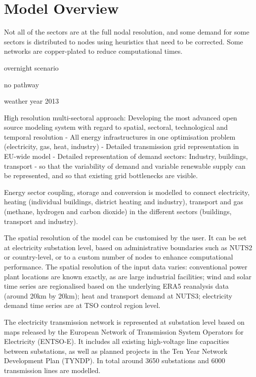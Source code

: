 \section{Model Overview}

Not all of the sectors are at the full nodal resolution, and some demand for
some sectors is distributed to nodes using heuristics that need to be corrected.
Some networks are copper-plated to reduce computational times.

overnight scenario

no pathway

weather year 2013

High resolution multi-sectoral approach: Developing the most advanced open source modeling system with regard to spatial, sectoral, technological and temporal resolution
- All energy infrastructures in one optimisation problem (electricity, gas, heat, industry)
- Detailed transmission grid representation in EU-wide model
- Detailed representation of demand sectors: Industry, buildings, transport
- so that the variability of demand and variable renewable supply can be represented, and so that existing grid bottlenecks are visible.

Energy sector coupling, storage and conversion is modelled to connect
electricity, heating (individual buildings, district heating and industry),
transport and gas (methane, hydrogen and carbon dioxide) in the different
sectors (buildings, transport and industry).

The spatial resolution of the model can be customised by the user. It can be set
at electricity substation level, based on administrative boundaries such as
NUTS2 or country-level, or to a custom number of nodes to enhance computational
performance. The spatial resolution of the input data varies: conventional power
plant locations are known exactly, as are large industrial facilities; wind and
solar time series are regionalised based on the underlying ERA5 reanalysis data
(around 20km by 20km); heat and transport demand at NUTS3; electricity demand
time series are at TSO control region level.

The electricity transmission
network is represented at substation level based on maps released by the
European Network of Transmission System Operators for Electricity (ENTSO-E). It
includes all existing high-voltage line capacities between substations, as well
as planned projects in the Ten Year Network Development Plan (TYNDP). In total
around 3650 substations and 6000 transmission lines are modelled.

